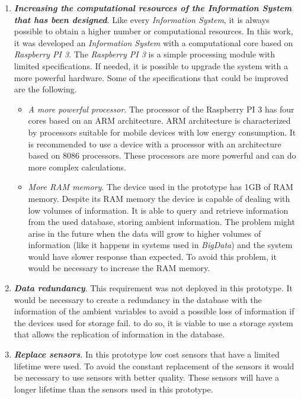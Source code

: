\begin{enumerate}

\item \textbf{\textit{Increasing the computational resources of the \textit{Information System} that has been designed}}. Like every \textit{Information System}, it is always possible to obtain a higher number or computational resources. In this work, it was developed an \textit{Information System} with a computational core based on \textit{Raspberry PI 3}. The \textit{Raspberry PI 3} is a simple processing module with limited specifications. If needed, it is possible to upgrade the system with a more powerful hardware. Some of the specifications that could be improved are the following.\\

\begin{itemize}

\item \textit{A more powerful processor}. The processor of the Raspberry PI 3 has four cores based on an ARM architecture. ARM architecture is characterized by processors suitable for mobile devices with low energy consumption. It is recommended to use a device with a processor with an architecture based on 8086 processors. These processors are more powerful and can do more complex calculations.

\item \textit{More RAM memory}. The device used in the prototype has 1GB of RAM memory. Despite its RAM memory the device is capable of dealing with low volumes of information. It is able to query and retrieve information from the used database, storing ambient information. The problem might arise in the future when the data will grow to higher volumes of information (like it happens in systems used in \textit{BigData}) and the system would have slower response than expected. To avoid this problem, it would be necessary to increase the RAM memory.

\end{itemize}

\item \textbf{\textit{Data redundancy}}. This requirement was not deployed in this prototype. It would be necessary to create a redundancy in the database with the information of the ambient variables to avoid a possible loss of information if the devices used for storage fail. to do so, it is viable to use a storage system that allows the replication of information in the database.

\item \textbf{\textit{Replace sensors}}. In this prototype low cost sensors that have a limited lifetime were used. To avoid the constant replacement of the sensors it would be necessary to use sensors with better quality. These sensors will have a longer lifetime than the sensors used in this prototype.


\end{enumerate}
